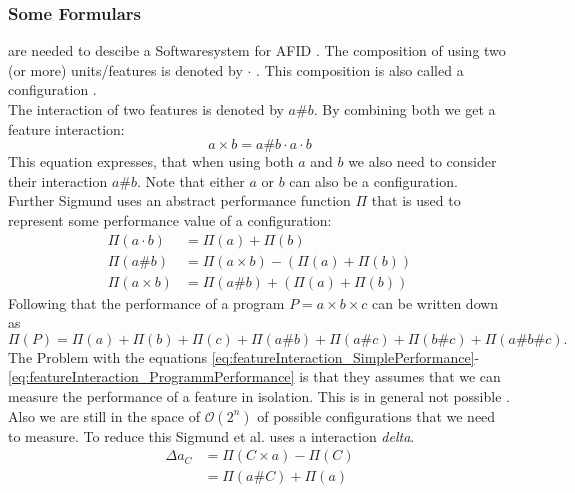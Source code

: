 \subsubsection[Formulars]{\textnormal{Some} Formulars} are needed to descibe a Softwaresystem for AFID .
The composition of using two (or more) units/features is denoted by $\cdot$ . This composition is also called a configuration \cite{VariabilityAwarePerformancePredictionJianmeiSigmundApel}.\\
The interaction of two features is denoted by $a\#b$. By combining both we get a feature interaction:
\begin{equation}
 a \times b = a\#b \cdot a \cdot b
\end{equation} 
This equation expresses, that when using both $a$ and $b$ we also need to consider their interaction $a\# b$. Note that either $a$ or $b$ can also be a configuration.\\
Further Sigmund uses an abstract performance function $\Pi$ that is used to represent some performance value of a configuration:
\begin{align}
\Pi(a \cdot b) &= \Pi(a) + \Pi(b)\label{eq:featureInteraction_SimplePerformance}\\
\Pi(a\#b) &= \Pi(a \times b) - (\Pi(a) + \Pi(b))\\
\Pi(a \times b) &=  \Pi(a\#b) + (\Pi(a) + \Pi(b))\label{eq:featureInteraction_InteractionPerformances}
\end{align}
Following that the performance of a program $P = a \times b \times c$ can be written down as
\begin{equation}\label{eq:featureInteraction_ProgrammPerformance}
\Pi(P) = \Pi(a) +  \Pi(b) +  \Pi(c) +  \Pi(a\#b) +  \Pi(a\#c) +  \Pi(b\#c) +  \Pi(a\#b\#c). 
\end{equation}
The Problem with the equations \ref{eq:featureInteraction_SimplePerformance}-\ref{eq:featureInteraction_ProgrammPerformance} is that they assumes that we can measure the performance of a feature in isolation. This is in general not possible \cite{AutomatedFeatureDetectionSiegmund2012}. Also we are still in the space of $\mathcal{O}(2^n)$ of possible configurations that we need to measure.  
To reduce this Sigmund et al. uses a interaction \textit{delta}. 
\begin{equation}
\begin{split}
\Delta a_C &= \Pi(C\times a) - \Pi(C)\\
&=\Pi(a\# C) + \Pi(a)
\end{split}
\end{equation}
